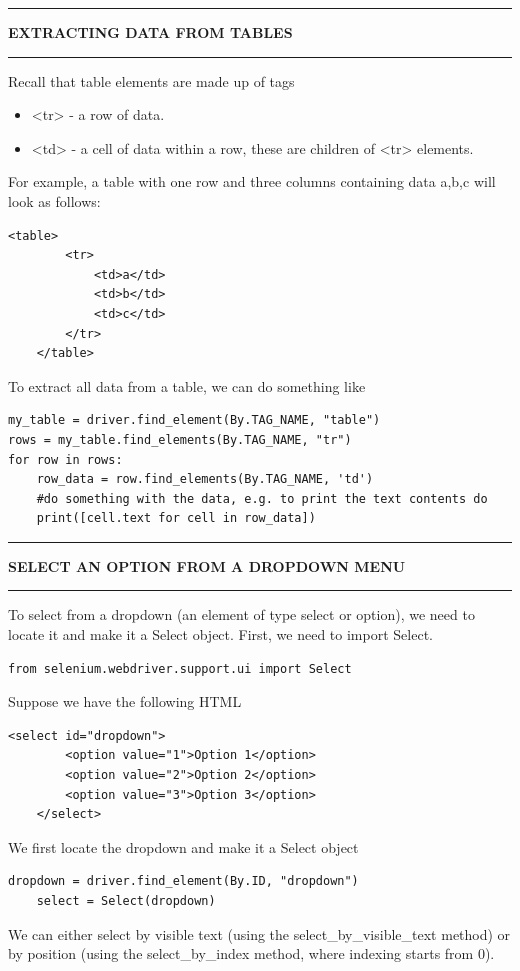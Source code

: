 \documentclass[8pt]{extarticle}
\newcommand{\heading}[1]{%
    \noindent
    \rule{\linewidth}{0.4pt}
    \begin{center}
        \vspace{-1ex}
        \textbf{#1}        
        \vspace{-2.5ex}
    \end{center}
    \rule{\linewidth}{0.4pt}
}
\begin{document}
\begin{multicols}{3}
\heading{EXTRACTING DATA FROM TABLES}

Recall that table elements are made up of tags
\begin{itemize}
    \item <tr> - a row of data.
    \item <td> - a cell of data within a row, these are children of <tr> elements.
\end{itemize}
For example, a table with one row and three columns containing data a,b,c will look as follows:
\begin{lstlisting}[style=html] 
    <table>
        <tr>
            <td>a</td>
            <td>b</td>
            <td>c</td>
        </tr>
    </table>
\end{lstlisting}

To extract all data from a table, we can do something like
\begin{lstlisting}[style=python] 
my_table = driver.find_element(By.TAG_NAME, "table")
rows = my_table.find_elements(By.TAG_NAME, "tr")
for row in rows:
    row_data = row.find_elements(By.TAG_NAME, 'td')
    #do something with the data, e.g. to print the text contents do
    print([cell.text for cell in row_data])
\end{lstlisting}

\columnbreak
\heading{SELECT AN OPTION FROM A DROPDOWN MENU}

To select from a dropdown (an element of type select or option), we need to locate it and make it a Select object. First, we need to import Select.
\begin{lstlisting}[style=python]   
    from selenium.webdriver.support.ui import Select
\end{lstlisting}

Suppose we have the following HTML 
\begin{lstlisting}[style=html]   
    <select id="dropdown">
        <option value="1">Option 1</option>
        <option value="2">Option 2</option>
        <option value="3">Option 3</option>
    </select>
\end{lstlisting}
We first locate the dropdown and make it a Select object
\begin{lstlisting}[style=python]   
    dropdown = driver.find_element(By.ID, "dropdown")
    select = Select(dropdown)
\end{lstlisting}
We can either select by visible text (using the select\_by\_visible\_text method) or by position (using the select\_by\_index method, where indexing starts from 0). \\


\end{multicols}
\end{document}
